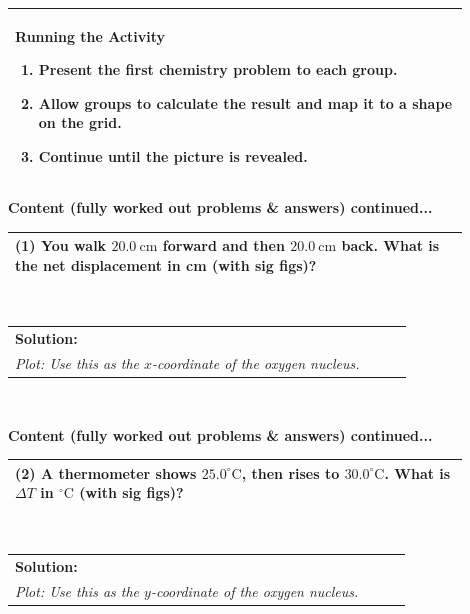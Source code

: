 \documentclass{article}
\begin{document}
{\begin{tabular}{|p{0.9\linewidth}|}
\textbf{Running the Activity}
\begin{enumerate}
    \item Present the first chemistry problem to each group.
    \item Allow groups to calculate the result and map it to a shape on the grid.
    \item Continue until the picture is revealed.
\end{enumerate}
\\ \hline
\end{tabular}

\newpage
\noindent
{\large \textbf{Content (fully worked out problems \& answers) continued...}
\\
\begin{tabular}{|p{0.9\linewidth}|}
\hline
\textbf{(1)} You walk $20.0~\text{cm}$ forward and then $20.0~\text{cm}$ back. What is the net displacement in cm (with sig figs)?
\\ \hline
\end{tabular}
\\
\begin{tabular}{|p{0.9\linewidth}|}
\hline
\textbf{Solution:} \\
\textit{Plot: Use this as the $x$-coordinate of the oxygen nucleus.} \\
\hline
\end{tabular}
\\
\newpage
\noindent
{\large \textbf{Content (fully worked out problems \& answers) continued...}
\\
\begin{tabular}{|p{0.9\linewidth}|}
\hline
\textbf{(2)} A thermometer shows $25.0^\circ\text{C}$, then rises to $30.0^\circ\text{C}$. What is $\Delta T$ in $^\circ\text{C}$ (with sig figs)?
\\ \hline
\end{tabular}
\\
\begin{tabular}{|p{0.9\linewidth}|}
\hline
\textbf{Solution:} \\
\textit{Plot: Use this as the $y$-coordinate of the oxygen nucleus.} \\
\hline
\end{tabular}
\\
\begin{tikzpicture}[scale=2]

\end{tikzpicture}}}}
\end{document}
